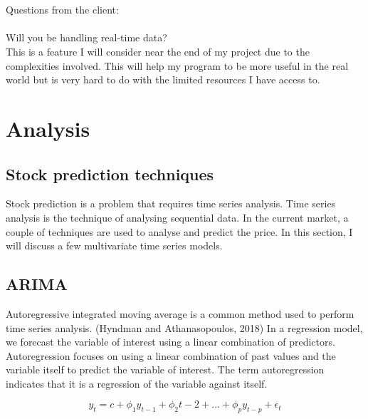\documentclass{article}
\begin{document}
\\\\
Questions from the client:\\
\\
Will you be handling real-time data?\\
This is a feature I will consider near the end of my project due to the complexities involved. This will help my program to be more useful in the real world but is very hard to do with the limited resources I have access to.



\section{Analysis}
\subsection{Stock prediction techniques}
Stock prediction is a problem that requires time series analysis. Time series analysis is the technique of analysing sequential data.
In the current market, a couple of techniques are used to analyse and predict the price. In this section, I will discuss a few multivariate time series models.

\subsection{ARIMA}
Autoregressive integrated moving average is a common method used to perform time series analysis.
(Hyndman and Athanasopoulos, 2018)
In a regression model, we forecast the variable of interest using a linear combination of predictors. Autoregression focuses on using a linear combination of past values and the variable itself to predict the variable of interest. The term autoregression indicates that it is a regression of the variable against itself.

\begin{equation}
    y_t = c + \phi_1 y_{t-1} + \phi_2 {t-2} + ... + \phi_p y_{t-p} + \epsilon_t
\end{equation}
\end{document}
